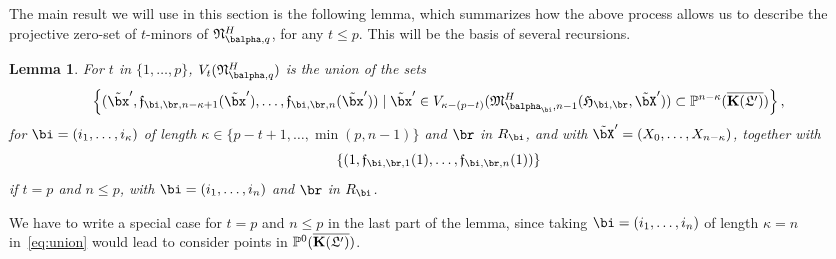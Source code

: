 \documentclass[12pt]{article}
\newtheorem{lemma}[definition]{Lemma}
\begin{document}
The main result we will use in this section is the following lemma,
which summarizes how the above process allows us to describe the
projective zero-set of $t$-minors of $\mathfrak{N}^H_{\balpha,q}$, for
any $t \le p$. This will be the basis of several recursions.
\begin{lemma}\label{lemma:union}
  For $t$ in $\{1,\dots,p\}$, $V_t(\mathfrak{N}^H_{\balpha,q})$ is the
  union of the sets
 \begin{align}\label{eq:union}
 \left \{(\tilde\bx',\mathfrak{f}_{\bi,\br,n-\kappa+1}(\tilde\bx'),\dots,\mathfrak{f}_{\bi,\br,n}(\tilde\bx')) \mid \tilde\bx' \in
  V_{\kappa-(p-t)}(\mathfrak{M}^H_{\balpha_\bi,n-1}(\mathfrak{H}_{\bi,\br},\tilde\bX')) \subset \P^{n-\kappa}(\KKGpbar)\right \},   
 \end{align}
 for $\bi=(i_1,\dots,i_\kappa)$ of length $\kappa \in \{p-t+1,\dots,\min(p,n-1)\}$ and $\br$ in $R_\bi$,
 and with $\tilde\bX'=(X_0,\dots,X_{n-\kappa})$, together with
 $$\left \{
 (1,\mathfrak{f}_{\bi,\br,1}(1),\dots,\mathfrak{f}_{\bi,\br,n}(1))\right
 \}$$ if $t=p$ and $n \le p$, with $\bi=(i_1,\dots,i_n)$ and $\br$ in $R_\bi$.
\end{lemma}
\noindent We have to write a special case for $t=p$ and $n \le p$ in the last part of the lemma,
since taking $\bi=(i_1,\dots,i_n)$ of length $\kappa=n$
in~\eqref{eq:union} would lead to consider points in $\mathbb{P}^0(\overline{\mathbf{K}(\mathfrak{L}')})$.
\end{document}
